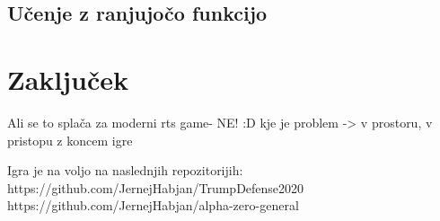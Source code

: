 \documentclass[a4paper, 12pt]{book}
\begin{document}
\section{Učenje z ranjujočo funkcijo}


\chapter{Zaključek}
\label{chzakljucek}
Ali se to splača za moderni rts game- NE! :D
kje je problem -> v prostoru, v pristopu z koncem igre


Igra je na voljo na naslednjih repozitorijih:
https://github.com/JernejHabjan/TrumpDefense2020
https://github.com/JernejHabjan/alpha-zero-general


\newpage %
\ \\
\clearpage
{}


\end{document}
